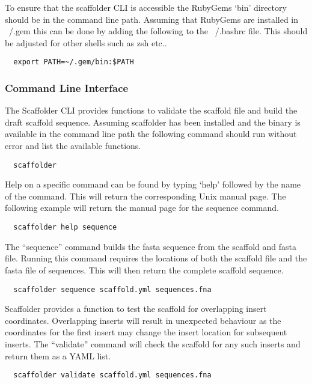 \documentclass[10pt]{bmc_article}
\newenvironment{bmcformat}{\begin{raggedright}\baselineskip20pt\sloppy\setboolean{publ}{false}}{\end{raggedright}\baselineskip20pt\sloppy}
\begin{document}
\begin{bmcformat}
To ensure that the scaffolder CLI is accessible the RubyGems `bin' directory
should be in the command line path. Assuming that RubyGems are installed in
~/.gem this can be done by adding the following to the ~/.bashrc file. This
should be adjusted for other shells such as zsh etc..

\begin{verbatim}
  export PATH=~/.gem/bin:$PATH
\end{verbatim}

\subsubsection*{Command Line Interface} %

The Scaffolder CLI provides functions to validate the scaffold file and build the draft scaffold sequence. Assuming scaffolder has been installed and the
binary is available in the command line path the following command should run without error and list the available functions. \pb

\begin{verbatim}
  scaffolder
\end{verbatim}

Help on a specific command can be found by typing `help' followed by the name
of the command. This will return the corresponding Unix manual page. The
following example will return the manual page for the sequence command. \pb

\begin{verbatim}
  scaffolder help sequence
\end{verbatim} 

The ``sequence'' command builds the fasta sequence from the scaffold and fasta
file. Running this command requires the locations of both the scaffold file and
the fasta file of sequences. This will then return the complete scaffold
sequence. \pb

\begin{verbatim}
  scaffolder sequence scaffold.yml sequences.fna
\end{verbatim}

Scaffolder provides a function to test the scaffold for overlapping insert
coordinates. Overlapping inserts will result in unexpected behaviour as the
coordinates for the first insert may change the insert location for subsequent
inserts. The ``validate'' command will check the scaffold for any such inserts
and return them as a YAML list. \pb

\begin{verbatim}
  scaffolder validate scaffold.yml sequences.fna
\end{verbatim}


\end{bmcformat}
\end{document}
